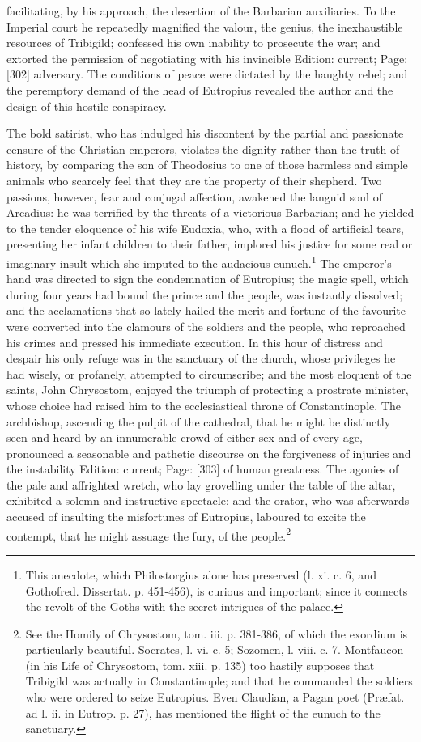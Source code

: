 facilitating, by his approach, the desertion of the Barbarian auxiliaries. To the Imperial court he repeatedly magnified the valour, the genius, the inexhaustible resources of Tribigild; confessed his own inability to prosecute the war; and extorted the permission of negotiating with his invincible Edition: current; Page: [302] adversary. The conditions of peace were dictated by the haughty rebel; and the peremptory demand of the head of Eutropius revealed the author and the design of this hostile conspiracy.

The bold satirist, who has indulged his discontent by the partial and passionate censure of the Christian emperors, violates the dignity rather than the truth of history, by comparing the son of Theodosius to one of those harmless and simple animals who scarcely feel that they are the property of their shepherd. Two passions, however, fear and conjugal affection, awakened the languid soul of Arcadius: he was terrified by the threats of a victorious Barbarian; and he yielded to the tender eloquence of his wife Eudoxia, who, with a flood of artificial tears, presenting her infant children to their father, implored his justice for some real or imaginary insult which she imputed to the audacious eunuch.\footnote{This anecdote, which Philostorgius alone has preserved (l. xi. c. 6, and Gothofred. Dissertat. p. 451-456), is curious and important; since it connects the revolt of the Goths with the secret intrigues of the palace.} The emperor\texthebrew{}’s hand was directed to sign the condemnation of Eutropius; the magic spell, which during four years had bound the prince and the people, was instantly dissolved; and the acclamations that so lately hailed the merit and fortune of the favourite were converted into the clamours of the soldiers and the people, who reproached his crimes and pressed his immediate execution. In this hour of distress and despair his only refuge was in the sanctuary of the church, whose privileges he had wisely, or profanely, attempted to circumscribe; and the most eloquent of the saints, John Chrysostom, enjoyed the triumph of protecting a prostrate minister, whose choice had raised him to the ecclesiastical throne of Constantinople. The archbishop, ascending the pulpit of the cathedral, that he might be distinctly seen and heard by an innumerable crowd of either sex and of every age, pronounced a seasonable and pathetic discourse on the forgiveness of injuries and the instability Edition: current; Page: [303] of human greatness. The agonies of the pale and affrighted wretch, who lay grovelling under the table of the altar, exhibited a solemn and instructive spectacle; and the orator, who was afterwards accused of insulting the misfortunes of Eutropius, laboured to excite the contempt, that he might assuage the fury, of the people.\footnote{See the Homily of Chrysostom, tom. iii. p. 381-386, of which the exordium is particularly beautiful. Socrates, l. vi. c. 5; Sozomen, l. viii. c. 7. Montfaucon (in his Life of Chrysostom, tom. xiii. p. 135) too hastily supposes that Tribigild was actually in Constantinople; and that he commanded the soldiers who were ordered to seize Eutropius. Even Claudian, a Pagan poet (Præfat. ad l. ii. in Eutrop. p. 27), has mentioned the flight of the eunuch to the sanctuary.

}
